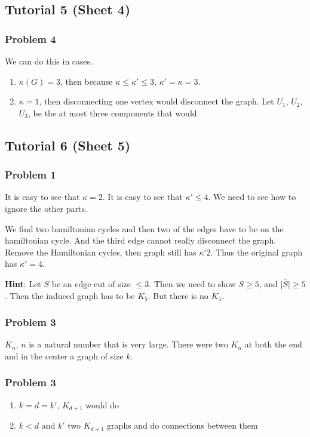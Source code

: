 \documentclass[11pt]{article}
\begin{document}
\subsection{Tutorial 5 (Sheet 4)}
\label{sec:org9567c10}
\subsubsection{Problem 4}
\label{sec:org3d4703c}
We can do this in cases.

\begin{enumerate}
\item \(\kappa(G) = 3\), then because \(\kappa \le \kappa' \le 3\), \(\kappa' =
       \kappa = 3\).
\item \(\kappa = 1\), then disconnecting one vertex would disconnect the graph.
Let \(U_1\), \(U_2\), \(U_3\), be the at most three components that would
\end{enumerate}
\subsection{Tutorial 6 (Sheet 5)}
\label{sec:org55cc93a}
\subsubsection{Problem 1}
\label{sec:org78081d3}
It is easy to see that \(\kappa = 2\). It is easy to see that \(\kappa' \le 4\).
We need to see how to ignore the other parts.

We find two hamiltonian cycles and then two of the edges have to be on the
hamiltonian cycle. And the third edge cannot really disconnect the graph.
Remove the Hamiltonian cycles, then graph still has \(\kappa' 2\). Thus the
original graph has \(\kappa' = 4\).

\textbf{Hint}: Let \(S\) be an edge cut of size \(\le 3\). Then we need to show \(S \ge
    5\), and \(\vert \bar{S}\vert \ge 5\). Then the induced graph has to be \(K_5\). But
there is no \(K_5\).
\subsubsection{Problem 3}
\label{sec:org30d8121}
\(K_n\), \(n\) is a natural number that is very large. There were two \(K_n\) at
both the end and in the center a graph of size \(k\).
\subsubsection{Problem 3}
\label{sec:org0da78bb}
\begin{enumerate}
\item \(k=d=k'\), \(K_{d+1}\) would do
\item \(k < d\) and \(k'\) two \(K_{d+1}\) graphs and do connections between them
\end{enumerate}
\end{document}
